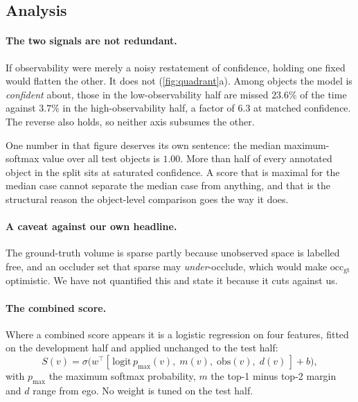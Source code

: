 \documentclass[10pt,twocolumn,letterpaper]{article}
\begin{document}
\subsection{Analysis}
\label{sec:analysis}

\paragraph{The two signals are not redundant.}
If observability were merely a noisy restatement of confidence, holding one
fixed would flatten the other. It does not (\cref{fig:quadrant}a). Among
objects the model is \emph{confident} about, those in the low-observability
half are missed $23.6\%$ of the time against $3.7\%$ in the
high-observability half, a factor of $6.3$ at matched confidence. The
reverse also holds, so neither axis subsumes the other.

One number in that figure deserves its own sentence: the median
maximum-softmax value over all test objects is $1.00$. More than half of
every annotated object in the split sits at saturated confidence. A score
that is maximal for the median case cannot separate the median case from
anything, and that is the structural reason the object-level comparison
goes the way it does.

\paragraph{A caveat against our own headline.} The ground-truth volume is
sparse partly because unobserved space is labelled free, and an occluder
set that sparse may \emph{under}-occlude, which would make
$\text{occ}_{\text{gt}}$ optimistic. We have not quantified this and state
it because it cuts against us.



\paragraph{The combined score.}
Where a combined score appears it is a logistic regression on four features,
fitted on the development half and applied unchanged to the test half:
\begin{equation}
S(v) = \sigma\!\big(w^{\!\top}
  [\,\mathrm{logit}\,p_{\max}(v),\; m(v),\; \mathrm{obs}(v),\; d(v)\,] + b\big),
\label{eq:combined}
\end{equation}
with $p_{\max}$ the maximum softmax probability, $m$ the top-1 minus top-2
margin and $d$ range from ego. No weight is tuned on the test half.
\end{document}

